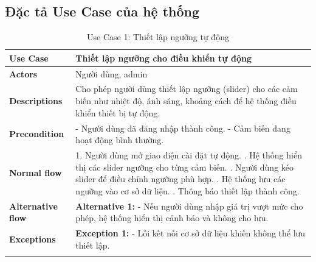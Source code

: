 \subsection{Đặc tả Use Case của hệ thống}
\begin{longtable}{|p{}|p{}|}
    \hline
    \textbf{Use Case}         & Thiết lập ngưỡng cho điều khiển tự động                                                                                                     \\
    \hline
    \textbf{Actors}           & Người dùng, admin                                                                                                                           \\
    \hline
    \textbf{Descriptions}     & Cho phép người dùng thiết lập ngưỡng (slider) cho các cảm biến như nhiệt độ, ánh sáng, khoảng cách để hệ thống điều khiển thiết bị tự động. \\
    \hline
    \textbf{Precondition}     &
    - Người dùng đã đăng nhập thành công. \newline
    - Cảm biến đang hoạt động bình thường.                                                                                                                                  \\
    \hline
    \textbf{Normal flow}      &
    1. Người dùng mở giao diện cài đặt tự động. \newline
    2. Hệ thống hiển thị các slider ngưỡng cho từng cảm biến. \newline
    3. Người dùng kéo slider để điều chỉnh ngưỡng phù hợp. \newline
    4. Hệ thống lưu các ngưỡng vào cơ sở dữ liệu. \newline
    5. Thông báo thiết lập thành công.                                                                                                                                      \\
    \hline
    \textbf{Alternative flow} &
    \textbf{Alternative 1:} \newline
    - Nếu người dùng nhập giá trị vượt mức cho phép, hệ thống hiển thị cảnh báo và không cho lưu.                                                                           \\
    \hline
    \textbf{Exceptions}       &
    \textbf{Exception 1:} \newline
    - Lỗi kết nối cơ sở dữ liệu khiến không thể lưu thiết lập.                                                                                                              \\
    \hline
    \caption{Use Case 1: Thiết lập ngưỡng tự động}
    \label{tab:usecase1}
\end{longtable}


